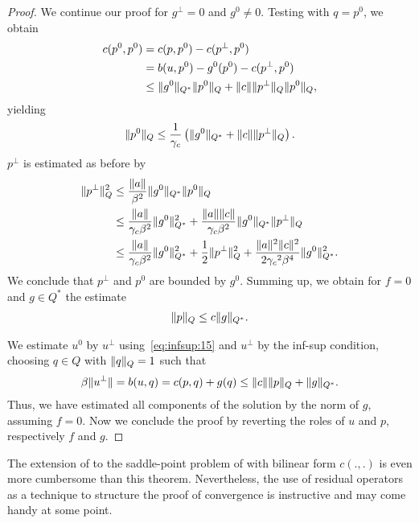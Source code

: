 \begin{proof}
  We continue our proof for $g^\perp=0$ and $g^0 \neq 0$. Testing with
  $q=p^0$, we obtain
  \begin{align}
    c(p^0,p^0)
    &= c(p,p^0) - c(p^\perp,p^0) \\
    &= b(u,p^0) - g^0(p^0) - c(p^\perp,p^0) \\
    &\le \lVert g^0\rVert_{Q^*} \lVert p^0\rVert_Q
      + \lVert c\rVert \lVert p^\perp\rVert_Q \lVert p^0\rVert_Q,
  \end{align}
  yielding
  \begin{gather}
    \lVert p^0\rVert_Q \le \frac1{\gamma_c}
    \left(\lVert g^0\rVert_{Q^*} + \lVert c\rVert \lVert p^\perp\rVert_Q\right).
  \end{gather}
  $p^\perp$ is estimated as before by
  \begin{align}
    \lVert p^\perp\rVert_Q^2
    &\le \frac{\lVert a\rVert}{\beta^2}\lVert g^0\rVert_{Q^*} \lVert p^0\rVert_Q \\
    &\le \frac{\lVert a\rVert}{\gamma_c\beta^2} \lVert g^0\rVert_{Q^*}^2
      + \frac{\lVert a\rVert\lVert c\rVert}{\gamma_c\beta^2}
      \lVert g^0\rVert_{Q^*}\lVert p^\perp\rVert_Q\\
    &\le \frac{\lVert a\rVert}{\gamma_c\beta^2} \lVert g^0\rVert_{Q^*}^2
      + \frac12 \lVert p^\perp\rVert_Q^2
      + \frac{\lVert a\rVert^2 \lVert c\rVert^2}{2{\gamma_c}^2\beta^4} \lVert g^0\rVert_{Q^*}^2.
  \end{align}
  We conclude that $p^\perp$ and $p^0$ are bounded by $g^0$. Summing
  up, we obtain for $f=0$ and $g\in Q^*$ the estimate
  \begin{gather}
    \lVert p\rVert_Q \le c \lVert g\rVert_{Q^*}.
  \end{gather}

  We estimate $u^0$ by $u^\perp$ using~\eqref{eq:infsup:15} and
  $u^\perp$ by the inf-sup condition, choosing $q\in Q$ with
  $\lVert q\rVert_Q = 1$ such that
  \begin{gather}
    \beta\lVert u^\perp\rVert = b(u,q) = c(p,q) + g(q)
    \le \lVert c\rVert\lVert p\rVert_Q +  \lVert g\rVert_{Q^*}.
  \end{gather}
  Thus, we have estimated all components of the solution by the norm
  of $g$, assuming $f=0$. Now we conclude the proof by reverting the
  roles of $u$ and $p$, respectively $f$ and $g$.
\end{proof}

\begin{intro}
  The extension of  to the
  saddle-point problem of 
  with bilinear form $c(.,.)$ is even more cumbersome than this
  theorem. Nevertheless, the use of residual operators as a technique
  to structure the proof of convergence is instructive and may come
  handy at some point.
\end{intro}


